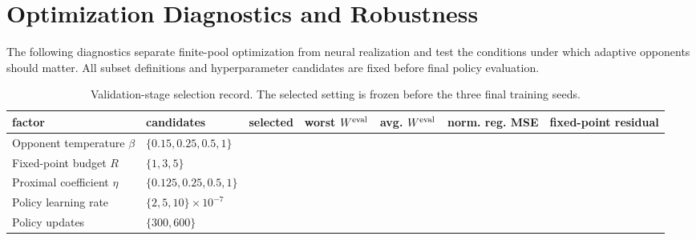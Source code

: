 \documentclass{article}
\theoremstyle{remark}
\theoremstyle{plain}
\newcommand{\pending}{\textemdash}
\begin{document}
\section{Optimization Diagnostics and Robustness}
\label{app:optimization-diagnostics}
The following diagnostics separate finite-pool optimization from neural realization and test the conditions under which adaptive opponents should matter. All subset definitions and hyperparameter candidates are fixed before final policy evaluation.

\begin{table}[t]
\centering\scriptsize
\setlength{\tabcolsep}{3.0pt}
\caption{Validation-stage selection record. The selected setting is frozen before the three final training seeds.}
\label{tab:optimization-ablation}
\begin{tabular}{lp{4.0cm}ccccc}
\toprule
factor & candidates & selected & worst $W^{\rm eval}$ & avg. $W^{\rm eval}$ & norm. reg. MSE & fixed-point residual\\
\midrule
Opponent temperature $\beta$ & $\{0.15,0.25,0.5,1\}$ & \pending & \pending & \pending & \pending & \pending\\
Fixed-point budget $R$ & $\{1,3,5\}$ & \pending & \pending & \pending & \pending & \pending\\
Proximal coefficient $\eta$ & $\{0.125,0.25,0.5,1\}$ & \pending & \pending & \pending & \pending & \pending\\
Policy learning rate & $\{2,5,10\}\times10^{-7}$ & \pending & \pending & \pending & \pending & \pending\\
Policy updates & $\{300,600\}$ & \pending & \pending & \pending & \pending & \pending\\
\bottomrule
\end{tabular}
\end{table}
\end{document}
